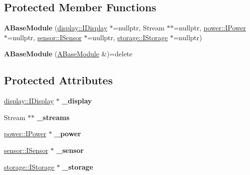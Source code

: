 \subsection*{Protected Member Functions}
\begin{DoxyCompactItemize}
\item 
\mbox{\label{classathome_1_1module_1_1_a_base_module_a7332012b2348fc3a945f9ec9db5d79ca}} 
{\bfseries A\+Base\+Module} (\mbox{\hyperlink{classathome_1_1display_1_1_i_display}{display\+::\+I\+Display}} $\ast$=nullptr, Stream $\ast$$\ast$=nullptr, \mbox{\hyperlink{classathome_1_1power_1_1_i_power}{power\+::\+I\+Power}} $\ast$=nullptr, \mbox{\hyperlink{classathome_1_1sensor_1_1_i_sensor}{sensor\+::\+I\+Sensor}} $\ast$=nullptr, \mbox{\hyperlink{classathome_1_1storage_1_1_i_storage}{storage\+::\+I\+Storage}} $\ast$=nullptr)
\item 
\mbox{\label{classathome_1_1module_1_1_a_base_module_ae2c52cb3313abb5ceb3c7bdb854e9850}} 
{\bfseries A\+Base\+Module} (\mbox{\hyperlink{classathome_1_1module_1_1_a_base_module}{A\+Base\+Module}} \&)=delete
\end{DoxyCompactItemize}
\subsection*{Protected Attributes}
\begin{DoxyCompactItemize}
\item 
\mbox{\label{classathome_1_1module_1_1_a_base_module_a1abf0c4e3eeb4824582f79a1d18c2b4c}} 
\mbox{\hyperlink{classathome_1_1display_1_1_i_display}{display\+::\+I\+Display}} $\ast$ {\bfseries \+\_\+display}
\item 
\mbox{\label{classathome_1_1module_1_1_a_base_module_a895fb5050ad2395c25a2e2b6f6e11986}} 
Stream $\ast$$\ast$ {\bfseries \+\_\+streams}
\item 
\mbox{\label{classathome_1_1module_1_1_a_base_module_ae4d60b3b0a69540cdef4bb1db08782ad}} 
\mbox{\hyperlink{classathome_1_1power_1_1_i_power}{power\+::\+I\+Power}} $\ast$ {\bfseries \+\_\+power}
\item 
\mbox{\label{classathome_1_1module_1_1_a_base_module_ae1a2e5cb4bd4a76cdf248c19110bd3ba}} 
\mbox{\hyperlink{classathome_1_1sensor_1_1_i_sensor}{sensor\+::\+I\+Sensor}} $\ast$ {\bfseries \+\_\+sensor}
\item 
\mbox{\label{classathome_1_1module_1_1_a_base_module_aa62dad921ff7db37a8501aa827f73e4f}} 
\mbox{\hyperlink{classathome_1_1storage_1_1_i_storage}{storage\+::\+I\+Storage}} $\ast$ {\bfseries \+\_\+storage}
\end{DoxyCompactItemize}


